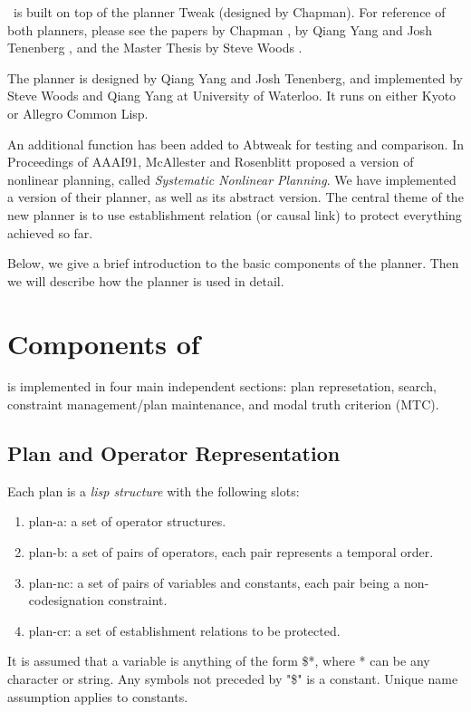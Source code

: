 \abtweak\ is built on top of the planner Tweak (designed by Chapman).  For
reference of both planners, please see the papers by Chapman
\cite{tweak}, by Qiang Yang and Josh Tenenberg \cite{abtweak}, and the
Master Thesis by Steve Woods \cite{thesis}.

The planner is designed by Qiang Yang and Josh Tenenberg, and
implemented by Steve Woods and Qiang Yang at University of Waterloo.
It runs on either Kyoto or Allegro Common Lisp.

An additional function has been added to Abtweak for testing and
comparison. In Proceedings of AAAI91, McAllester and Rosenblitt
proposed a version of nonlinear planning, called {\em Systematic
Nonlinear Planning}.  We have implemented a version of their planner, 
as well as its abstract version.  The central theme of the new planner
is to use establishment relation (or causal link) to protect
everything achieved so far.  

Below, we give a brief introduction to the basic components of the
planner.  Then we will describe how the planner is used in detail.

\section{Components of \tweak}
\tweak is implemented in four main independent sections: plan
represetation, search, constraint management/plan maintenance, and
modal truth criterion (MTC).

\subsection{Plan and Operator Representation}
Each plan is a {\em lisp structure} with the following slots:
\begin{enumerate}
\item plan-a:  a set of operator structures.
\item 
plan-b: a set of pairs of operators, each pair represents a temporal
order.
\item plan-nc: a set of pairs of variables and constants, each pair being a non-codesignation constraint.
\item plan-cr: a set of establishment relations to be protected.
\end{enumerate}

It is assumed that a variable is anything of the form \$*, where * can
be any character or string.  Any symbols not preceded by "\$" is a
constant.  Unique name assumption applies to constants.

